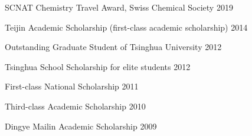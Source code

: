 

\begin{cvhonors}
  \cvhonor
  {SCNAT Chemistry Travel Award, Swiss Chemical Society}
  {2019}
  
  \cvhonor
  {Teijin Academic Scholarship (first-class academic scholarship)}
  {2014}
  
  \cvhonor
  {Outstanding Graduate Student of Tsinghua University}
  {2012}
  
  \cvhonor
  {Tsinghua School Scholarship for elite students}
  {2012}
  
  \cvhonor
  {First-class National Scholarship}
  {2011}
  
  \cvhonor
  {Third-class Academic Scholarship}
  {2010}
  
  \cvhonor
  {Dingye Mailin Academic Scholarship}
  {2009}
\end{cvhonors}
